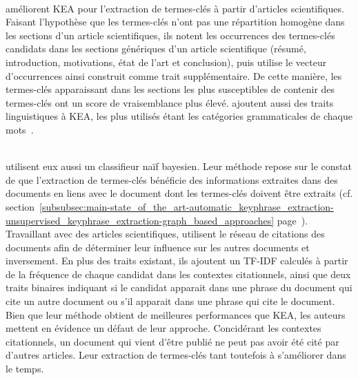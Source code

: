        ~\\ améliorent KEA pour
        l'extraction de termes-clés à partir d'articles scientifiques. Faisant
        l'hypothèse que les termes-clés n'ont pas une répartition homogène dans
        les sections d'un article scientifiques, ils notent les occurrences des
        termes-clés candidats dans les sections génériques d'un article
        scientifique (résumé, introduction, motivations, état de l'art et
        conclusion), puis utilise le vecteur d'occurrences ainsi construit comme
        trait supplémentaire. De cette manière, les termes-clés apparaissant
        dans les sections les plus susceptibles de contenir des termes-clés ont
        un score de vraisemblance plus élevé.
         ajoutent aussi des traits
        linguistiques à KEA, les plus utilisés étant les catégories
        grammaticales de chaque mots~\cite{hulth2003keywordextraction}.
        
        ~\\ utilisent
        eux aussi un classifieur naïf bayesien. Leur méthode repose sur le
        constat de  que l'extraction de termes-clés
        bénéficie des informations extraites dans des documents en liens avec le
        document dont les termes-clés doivent être extraits (cf.
        section~\ref{subsubsec:main-state_of_the_art-automatic_keyphrase_extraction-unsupervised_keyphrase_extraction-graph_based_approaches}
        page~\pageref{subsubsec:main-state_of_the_art-automatic_keyphrase_extraction-unsupervised_keyphrase_extraction-graph_based_approaches}).
        Travaillant avec des articles scientifiques,
         utilisent le
        réseau de citations des documents afin de déterminer leur influence sur
        les autres documents et inversement. En plus des traits existant, ils
        ajoutent un TF-IDF calculés à partir de la fréquence de chaque candidat
        dans les contextes citationnels, ainsi que deux traits binaires
        indiquant si le candidat apparait dans une phrase du document qui cite
        un autre document ou s'il apparait dans une phrase qui cite le document.
        Bien que leur méthode obtient de meilleures performances que KEA, les
        auteurs mettent en évidence un défaut de leur approche. Concidérant les
        contextes citationnels, un document qui vient d'être publié ne peut pas
        avoir été cité par d'autres articles. Leur extraction de termes-clés
        tant toutefois à s'améliorer dans le temps.

